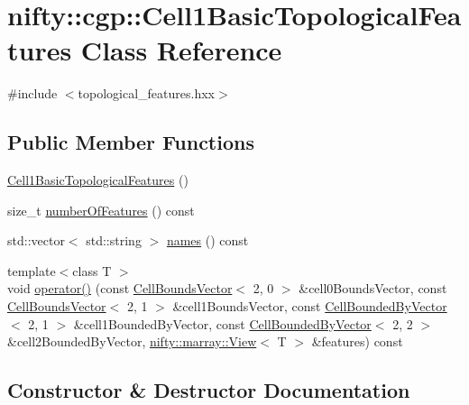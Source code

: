 \hypertarget{classnifty_1_1cgp_1_1Cell1BasicTopologicalFeatures}{}\section{nifty\+:\+:cgp\+:\+:Cell1\+Basic\+Topological\+Features Class Reference}
\label{classnifty_1_1cgp_1_1Cell1BasicTopologicalFeatures}


{\ttfamily \#include $<$topological\+\_\+features.\+hxx$>$}

\subsection*{Public Member Functions}
\begin{DoxyCompactItemize}
\item 
\hyperlink{classnifty_1_1cgp_1_1Cell1BasicTopologicalFeatures_acf309275f4b84d463dee9bea89cd5108}{Cell1\+Basic\+Topological\+Features} ()
\item 
size\+\_\+t \hyperlink{classnifty_1_1cgp_1_1Cell1BasicTopologicalFeatures_a0b3605cb2686b346cdc2dcd928da91e2}{number\+Of\+Features} () const
\item 
std\+::vector$<$ std\+::string $>$ \hyperlink{classnifty_1_1cgp_1_1Cell1BasicTopologicalFeatures_a3a7777668eaba9b0b767b6e9980d211d}{names} () const
\item 
{\footnotesize template$<$class T $>$ }\\void \hyperlink{classnifty_1_1cgp_1_1Cell1BasicTopologicalFeatures_aab5336ea5c4f981c15b4860c4f476795}{operator()} (const \hyperlink{classnifty_1_1cgp_1_1CellBoundsVector}{Cell\+Bounds\+Vector}$<$ 2, 0 $>$ \&cell0\+Bounds\+Vector, const \hyperlink{classnifty_1_1cgp_1_1CellBoundsVector}{Cell\+Bounds\+Vector}$<$ 2, 1 $>$ \&cell1\+Bounds\+Vector, const \hyperlink{classnifty_1_1cgp_1_1CellBoundedByVector}{Cell\+Bounded\+By\+Vector}$<$ 2, 1 $>$ \&cell1\+Bounded\+By\+Vector, const \hyperlink{classnifty_1_1cgp_1_1CellBoundedByVector}{Cell\+Bounded\+By\+Vector}$<$ 2, 2 $>$ \&cell2\+Bounded\+By\+Vector, \hyperlink{classandres_1_1View}{nifty\+::marray\+::\+View}$<$ T $>$ \&features) const
\end{DoxyCompactItemize}


\subsection{Constructor \& Destructor Documentation}
\mbox{\label{classnifty_1_1cgp_1_1Cell1BasicTopologicalFeatures_acf309275f4b84d463dee9bea89cd5108}} 
